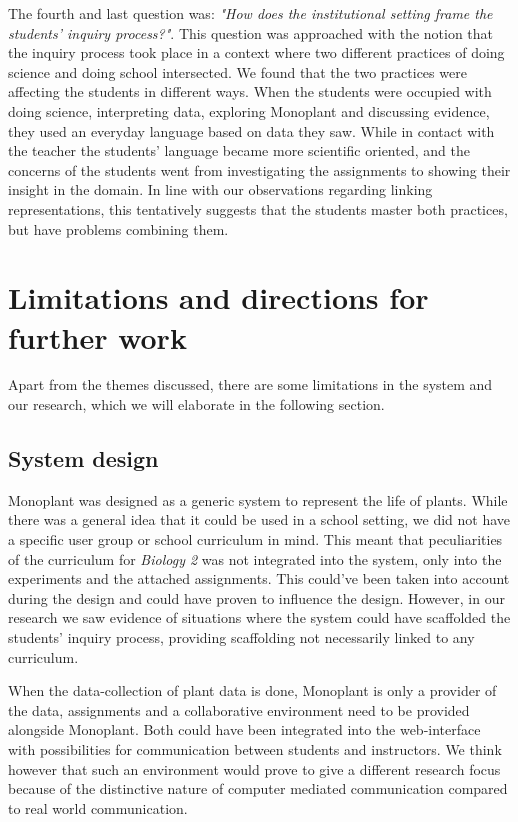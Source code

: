The fourth and last question was: \emph{"How does the institutional setting frame the students' inquiry process?"}. This question was approached with the notion that the inquiry process took place in a context where two different practices of doing science and doing school intersected. We found that the two practices were affecting the students in different ways. When the students were occupied with doing science, interpreting data, exploring Monoplant and discussing evidence, they used an everyday language based on data they saw. While in contact with the teacher the students' language became more scientific oriented, and the concerns of the students went from investigating the assignments to showing their insight in the domain. In line with our observations regarding linking representations, this tentatively suggests that the students master both practices, but have problems combining them.

\section{Limitations and directions for further work}
Apart from the themes discussed, there are some limitations in the system and our research, which we will elaborate in the following section. 

\subsection{System design}
Monoplant was designed as a generic system to represent the life of plants. While there was a general idea that it could be used in a school setting, we did not have a specific user group or school curriculum in mind. This meant that peculiarities of the curriculum for \emph{Biology 2} was not integrated into the system, only into the experiments and the attached assignments. This could've been taken into account during the design and could have proven to influence the design. However, in our research we saw evidence of situations where the system could have scaffolded the students' inquiry process, providing scaffolding not necessarily linked to any curriculum.

When the data-collection of plant data is done, Monoplant is only a provider of the data, assignments and a collaborative environment need to be provided alongside Monoplant. Both could have been integrated into the web-interface with possibilities for communication between students and instructors. We think however that such an environment would prove to give a different research focus because of the distinctive nature of computer mediated communication compared to real world communication.

